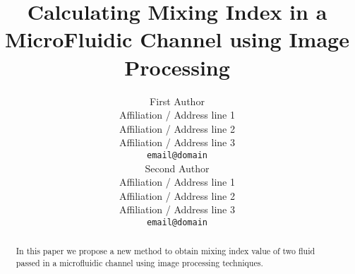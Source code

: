 \documentclass[11pt,a4paper]{article}
\title{Calculating Mixing Index in a MicroFluidic Channel using Image Processing}
\author{First Author \\
  Affiliation / Address line 1 \\
  Affiliation / Address line 2 \\
  Affiliation / Address line 3 \\
  \texttt{email@domain} \\\And
  Second Author \\
  Affiliation / Address line 1 \\
  Affiliation / Address line 2 \\
  Affiliation / Address line 3 \\
  \texttt{email@domain} \\}
\date{}
\begin{document}
\maketitle
\begin{abstract}
In this paper we propose a new method to obtain mixing index value of two fluid passed in a microfluidic channel using image processing techniques.
\end{abstract}


% 

% 
% 
% 



\end{document}
